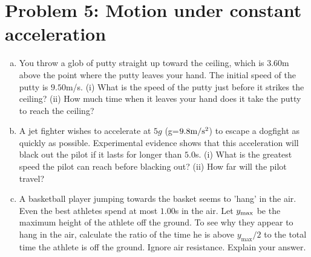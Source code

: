 \documentclass[10pt,letter]{article}
\begin{document}
\section*{Problem 5: Motion under constant acceleration}
\begin{enumerate}[(a)]
\item You throw a glob of putty straight up toward the ceiling, which is $3.60$m above the point where the putty leaves your hand. The initial speed of the putty is $9.50$m/s. (i) What is the speed of the putty just before it strikes the ceiling? (ii) How much time when it leaves your hand does it take the putty to reach the ceiling?
\item A jet fighter wishes to accelerate at $5g$ (g=$9.8 {\rm m}/{\rm s}^2$) to escape a dogfight as quickly as possible. Experimental evidence shows that this acceleration will black out the pilot if it lasts for longer than $5.0$s. (i) What is the greatest speed the pilot can reach before blacking out? (ii) How far will the pilot travel?
\item A basketball player jumping towards the basket seems to 'hang' in the air. Even the best athletes spend at most $1.00$s in the air. Let $y_{\rm max}$ be the maximum height of the athlete off the ground. To see why they appear to hang in the air, calculate the ratio of the time he is above $y_{\max}/2$ to the total time the athlete is off the ground. Ignore air resistance. Explain your answer.
\end{enumerate}
\end{document}
